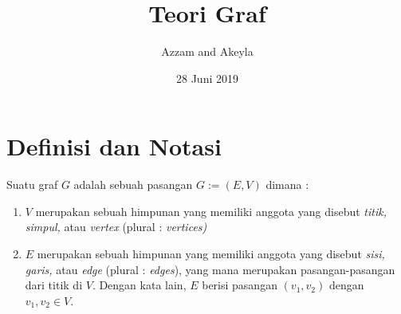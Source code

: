 \documentclass[11pt]{scrartcl}
\title{Teori Graf}
\author{Azzam and Akeyla}
\date{28 Juni 2019}
\begin{document}
\maketitle

\renewcommand*\contentsname{Daftar Isi}
\tableofcontents

\newpage

\section{Definisi dan Notasi}
Suatu graf $G$ adalah sebuah pasangan $G := (E,V)$ dimana : 
\begin{enumerate}
    \item $V$ merupakan sebuah himpunan yang memiliki anggota yang disebut \textit{titik, simpul,} atau \textit{vertex} (plural : \textit{vertices)}
    \item $E$ merupakan sebuah himpunan yang memiliki anggota yang disebut \textit{sisi, garis,} atau \textit{edge} (plural : \textit{edges}), yang mana merupakan pasangan-pasangan dari titik di $V$. Dengan kata lain, $E$ berisi pasangan $(v_1, v_2)$ dengan $v_1, v_2 \in V$.
\end{enumerate}
\end{document}
